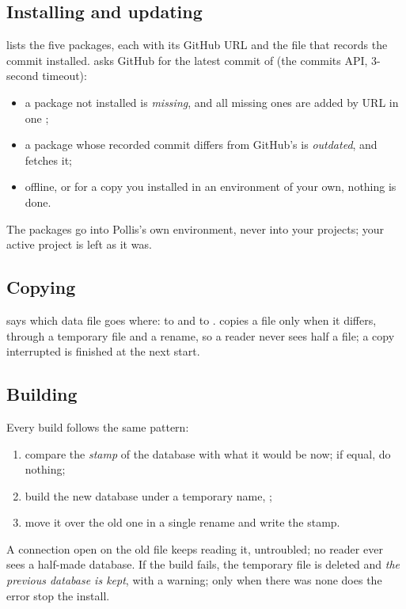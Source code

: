 \subsection{Installing and updating}
 lists the five packages, each with its GitHub URL and the file
 that records the commit installed.  asks
GitHub for the latest commit of  (the commits API, 3-second timeout):
\begin{itemize}
  \item a package not installed is \emph{missing}, and all missing ones are added by URL in one ;
  \item a package whose recorded commit differs from GitHub's is \emph{outdated}, and  fetches it;
  \item offline, or for a copy you installed in an environment of your own, nothing is done.
\end{itemize}
The packages go into Pollis's own environment, never into your projects; your active project is left as it was.

\subsection{Copying}
 says which data file goes where:  to
 and  to .
 copies a file only when it differs, through a temporary file and a rename, so a reader never
sees half a file; a copy interrupted is finished at the next start.

\subsection{Building}
Every build follows the same pattern:
\begin{enumerate}
  \item compare the \emph{stamp} of the database with what it would be now; if equal, do nothing;
  \item build the new database under a temporary name, ;
  \item move it over the old one in a single rename and write the stamp.
\end{enumerate}
A connection open on the old file keeps reading it, untroubled; no reader ever sees a half-made database. If the build
fails, the temporary file is deleted and \emph{the previous database is kept}, with a warning; only when there was none
does the error stop the install.

